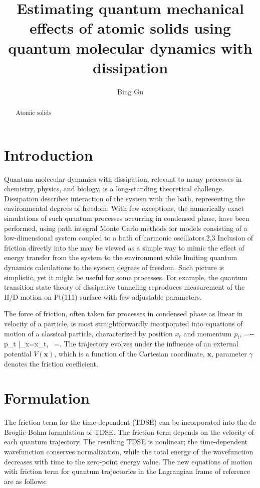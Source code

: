\documentclass[11pt]{revtex4}
\begin{document}
\title{Estimating quantum mechanical effects of atomic solids using quantum molecular dynamics with dissipation}
\author{Bing Gu}

\begin{abstract}
Atomic solids 
\end{abstract}

\maketitle

\section{Introduction}
Quantum molecular dynamics with dissipation, relevant to many processes in chemistry, physics, and biology, is a long-standing theoretical challenge. Dissipation describes interaction of the system with the bath, representing the environmental degrees of freedom. With few exceptions, the numerically exact simulations of such quantum processes occurring in condensed phase, have been performed, using path integral Monte Carlo methods for models consisting of a low-dimensional system coupled to a bath of harmonic oscillators.2,3 Inclusion of friction directly into the \se may be viewed as a simple way to mimic the effect of energy transfer from the system to the environment while limiting quantum dynamics calculations to the system degrees of freedom. Such picture is simplistic, yet it might be useful for some processes. For example, the quantum transition state theory of dissipative tunneling reproduces measurement of the H/D motion on Pt(111) surface with few adjustable parameters.

The force of friction, often taken for processes in condensed phase as linear in velocity of a particle, is most straightforwardly incorporated into equations of motion of a classical particle, characterized by position $x_t$ and momentum $p_t$, 
\be {}=--\gamma p_t |_{x=x_t}, ~=. \ee
The trajectory evolves under the influence of an external potential $V(\bm x)$, which is a function of the Cartesian coordinate, $\bm x$, parameter $\gamma$ denotes the friction coefficient.

\section{Formulation}
The friction term for the time-dependent \se (TDSE) can be incorporated into the de Broglie-Bohm formulation of TDSE. 
The friction term depends on the velocity of each quantum trajectory. The resulting TDSE is nonlinear; the time-dependent wavefunction conserves normalization, while the total energy of the wavefunction decreases with time to the zero-point energy value.
The new equations of motion with friction term for quantum trajectories in the Lagrangian frame of reference are as follows:
\end{document}
